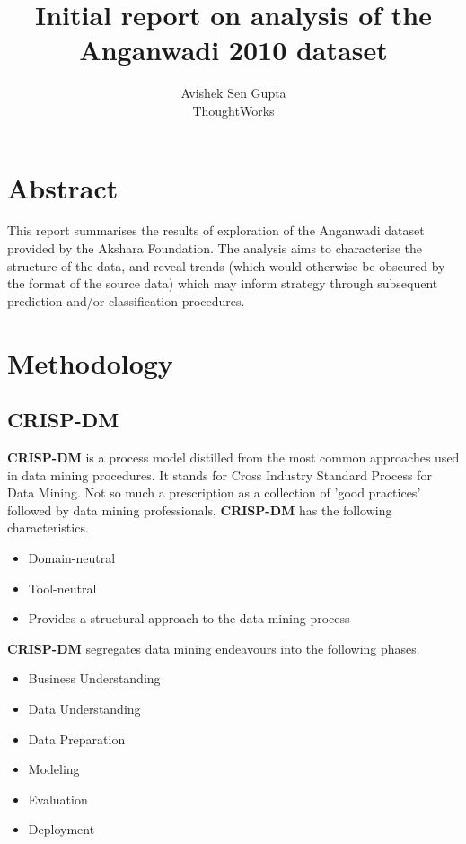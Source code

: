\documentclass[10pt]{article}
\begin{document}
\title{Initial report on analysis of the Anganwadi 2010 dataset} 
\author{Avishek Sen Gupta\\ThoughtWorks}
\maketitle
\newpage
\tableofcontents
\listoffigures
\newpage

\section{Abstract}
This report summarises the results of exploration of the Anganwadi dataset provided by the Akshara Foundation. The analysis aims to characterise the structure of the data, and reveal trends (which would otherwise be obscured by the format of the source data) which may inform strategy through subsequent prediction and/or classification procedures.

\newpage
\section{Methodology}
\subsection{CRISP-DM}
\textbf{CRISP-DM} is a process model distilled from the most common approaches used in data mining procedures. It stands for Cross Industry Standard Process for Data Mining. Not so much a prescription as a collection of 'good practices' followed by data mining professionals, \textbf{CRISP-DM} has the following characteristics.

\begin{itemize}
\item Domain-neutral
\item Tool-neutral
\item Provides a structural approach to the data mining process
\end{itemize}

\textbf{CRISP-DM} segregates data mining endeavours into the following phases.

\begin{itemize}
\item Business Understanding
\item Data Understanding
\item Data Preparation
\item Modeling
\item Evaluation
\item Deployment
\end{itemize}
\end{document}
